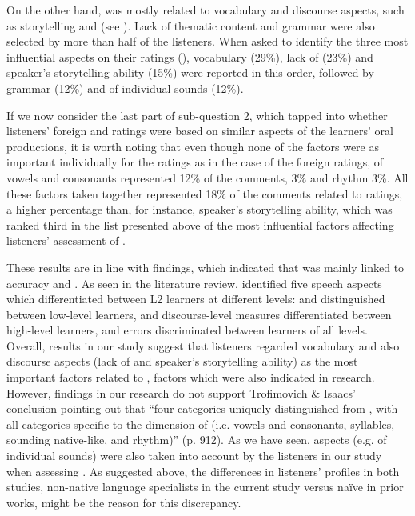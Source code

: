 \documentclass[output=paper]{langsci/langscibook}
\begin{document}
On the other hand,  was mostly related to vocabulary and discourse aspects, such as storytelling and  (see ). Lack of thematic content and grammar were also selected by more than half of the listeners. When asked to identify the three most influential aspects on their  ratings (), vocabulary (29\%), lack of  (23\%) and speaker’s storytelling ability (15\%) were reported in this order, followed by grammar (12\%) and  of individual sounds (12\%). 

\newpage 
If we now consider the last part of sub-question 2, which tapped into whether listeners’ foreign  and  ratings were based on similar aspects of the learners’ oral productions, it is worth noting that even though none of the  factors were as important individually for the  ratings as in the case of the foreign  ratings,  of vowels and consonants represented 12\% of the comments,  3\% and rhythm 3\%. All these  factors taken together represented 18\% of the comments related to  ratings, a higher percentage than, for instance, speaker’s storytelling ability, which was ranked third in the list presented above of the most influential factors affecting listeners’ assessment of . 

These results are in line with  findings, which indicated that  was mainly linked to  accuracy and . As seen in the literature review, \citet{TrofimovichIsaacs2012} identified five speech aspects which differentiated between {L2} learners at different  levels:  and  distinguished between low-level learners,  and discourse-level measures differentiated between high-level learners, and  errors discriminated between learners of all levels. Overall, results in our study suggest that listeners regarded vocabulary and also discourse aspects (lack of  and speaker’s storytelling ability) as the most important factors related to , factors which were also indicated in   research. However, findings in our research do not support Trofimovich \& Isaacs’ conclusion pointing out that “four categories uniquely distinguished  from , with all categories specific to the dimension of  (i.e. vowels and consonants, syllables, sounding native-like, and rhythm)” (p. 912).   As we have seen,  aspects (e.g.  of individual sounds) were also taken into account by the listeners in our study when assessing . As suggested above, the differences in listeners’ profiles in both studies, non-native language specialists in the current study versus naïve  in prior works, might be the reason for this discrepancy. 
\end{document}
